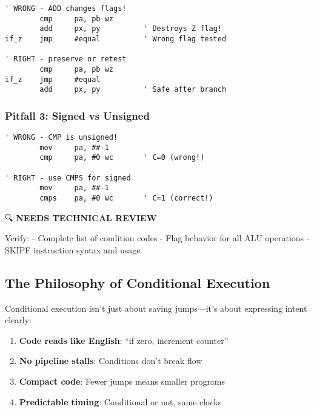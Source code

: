 \documentclass[11pt]{book}
\providecommand{\tightlist}{%
  \setlength{\itemsep}{0pt}\setlength{\parskip}{0pt}}
\begin{document}
\begin{lstlisting}
' WRONG - ADD changes flags!
        cmp     pa, pb wz
        add     px, py          ' Destroys Z flag!
if_z    jmp     #equal          ' Wrong flag tested

' RIGHT - preserve or retest
        cmp     pa, pb wz
if_z    jmp     #equal
        add     px, py          ' Safe after branch
\end{lstlisting}

\hypertarget{pitfall-3-signed-vs-unsigned}{%
\subsubsection{Pitfall 3: Signed vs
Unsigned}\label{pitfall-3-signed-vs-unsigned}}

\begin{lstlisting}
' WRONG - CMP is unsigned!
        mov     pa, ##-1
        cmp     pa, #0 wc       ' C=0 (wrong!)
        
' RIGHT - use CMPS for signed
        mov     pa, ##-1
        cmps    pa, #0 wc       ' C=1 (correct!)
\end{lstlisting}

\begin{review}
🔍 \textbf{NEEDS TECHNICAL REVIEW}

Verify:
- Complete list of condition codes
- Flag behavior for all ALU operations
- SKIPF instruction syntax and usage
\end{review}

\hypertarget{the-philosophy-of-conditional-execution}{%
\subsection{The Philosophy of Conditional
Execution}\label{the-philosophy-of-conditional-execution}}

Conditional execution isn't just about saving jumps---it's about
expressing intent clearly:

\begin{enumerate}
\def\labelenumi{\arabic{enumi}.}
\tightlist
\item
  \textbf{Code reads like English}: ``if zero, increment counter''
\item
  \textbf{No pipeline stalls}: Conditions don't break flow
\item
  \textbf{Compact code}: Fewer jumps means smaller programs
\item
  \textbf{Predictable timing}: Conditional or not, same clocks
\end{enumerate}
\end{document}
